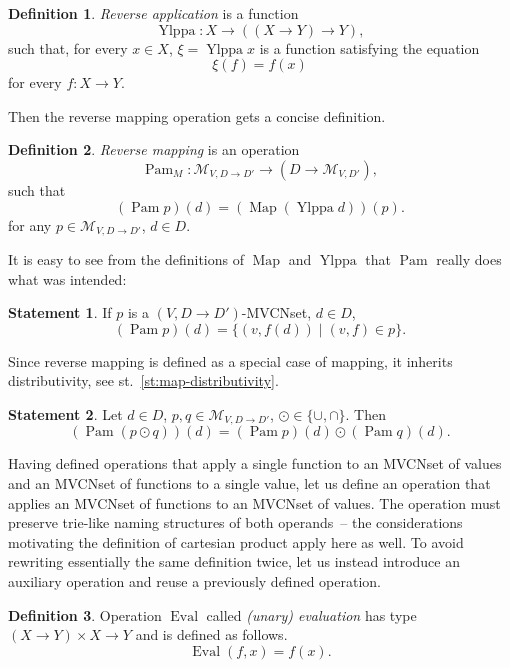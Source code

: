 \documentclass{article}
\theoremstyle{definition}
\newtheorem{Df}{Definition}
\newtheorem{St}{Statement}
\newcommand{\setcharmvcn}{M}
\newcommand{\setsymbol}[3]{\mathcal{#1}_{#2,#3}}
\newcommand{\setmvcn}[2]{\setsymbol{\setcharmvcn}{#1}{#2}}
\newcommand{\fmap}{\operatorname{Map}}
\newcommand{\fpam}{\operatorname{Pam}}
\newcommand{\ylppa}{\operatorname{Ylppa}}
\newcommand{\eval}{\operatorname{Eval}}
\begin{document}
\begin{Df}\label{df:ylppa}
\emph{Reverse application} is a function
\[
  \ylppa : X \to ((X \to Y) \to Y),
\]
such that, for every $x\in X$, $\xi = \ylppa x$ is a function satisfying the
equation
\[
  \xi(f) = f(x)
\]
for every $f: X\to Y$.
\end{Df}

Then the reverse mapping operation gets a concise definition.

\begin{Df}\label{df:mvcn-pam}
\emph{Reverse mapping} is an operation
\[
  \fpam_{\setcharmvcn} : \setmvcn{V}{D \to D'} \to (D \to \setmvcn{V}{D'}),
\]
such that
\[
  (\fpam p)(d) = (\fmap (\ylppa d))(p) .
\]
for any $p\in \setmvcn{V}{D \to D'}$, $d\in D$.
\end{Df}

It is easy to see from the definitions of $\fmap$ and $\ylppa$ that $\fpam$
really does what was intended:

\begin{St}\label{st:mvcn-pam}
If $p$ is a $(V, D\to D')$-MVCNset, $d\in D$,
\[
  (\fpam p)(d) = \{ (v, f(d)) \mid (v, f) \in p \} .
\]
\end{St}

Since reverse mapping is defined as a special case of mapping, it inherits
distributivity, see st.~\ref{st:map-distributivity}.

\begin{St}\label{st:pam-distributivity}
Let $d\in D$, $p, q \in \setmvcn{V}{D \to D'}$, $\odot \in \{\cup, \cap \}$. Then
\[
  (\fpam (p \odot q))(d) = (\fpam p)(d) \odot (\fpam q)(d) .
\]
\end{St}

Having defined operations that apply a single function to an MVCNset of values
and an MVCNset of functions to a single value, let us define an
operation that applies an MVCNset of functions to an MVCNset of values. The
operation must preserve trie-like naming structures of both operands~-- the
considerations motivating the definition of cartesian product apply here
as well. To avoid rewriting essentially the same definition twice, let us
instead introduce an auxiliary operation and reuse a previously defined
operation.

\begin{Df}\label{df:eval}
Operation $\eval$ called \emph{(unary) evaluation} has type
$(X \to Y) \times X \to Y$ and is defined as follows.
\[
  \eval (f, x) = f(x) .
\]
\end{Df}
\end{document}
